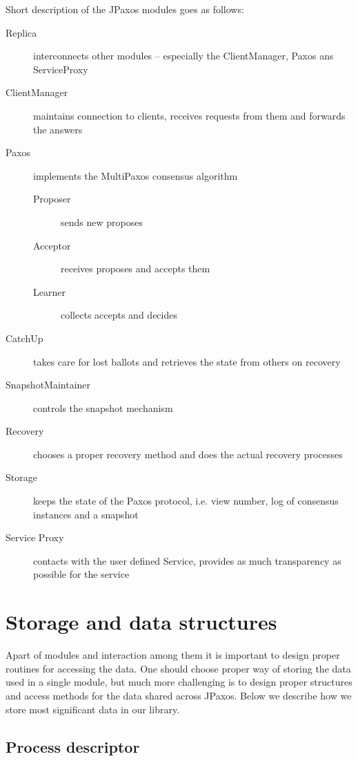 Short description of the JPaxos modules goes as follows:

\begin{description}
  \item[Replica ] interconnects other modules -- especially the ClientManager, Paxos ans ServiceProxy
  \item[ClientManager ] maintains connection to clients, receives requests from them and forwards the answers
  \item[Paxos ] implements the MultiPaxos consensus algorithm
  \begin{description}
    \item[Proposer ] sends new proposes
    \item[Acceptor ] receives proposes and accepts them
    \item[Learner ] collects accepts and decides
  \end{description}
  \item[CatchUp ] takes care for lost ballots and retrieves the state from others on recovery
  \item[SnapshotMaintainer ] controls the snapshot mechanism
  \item[Recovery ] chooses a proper recovery method and does the actual recovery processes
  \item[Storage ] keeps the state of the Paxos protocol, i.e. view number, log of consensus instances and a snapshot
  \item[Service Proxy ] contacts with the user defined Service, provides as much trans\-pa\-rency as possible for the service
\end{description}

\section{Storage and data structures}
\label{sec:storage_and_data_structures}

Apart of modules and interaction among them it is important to design proper routines for accessing the data.
One should choose proper way of storing the data used in a single module, but much more challenging is to design proper structures and access methods for the data shared across JPaxos. Below we describe how we store most significant data in our library. %

\subsection{Process descriptor}


